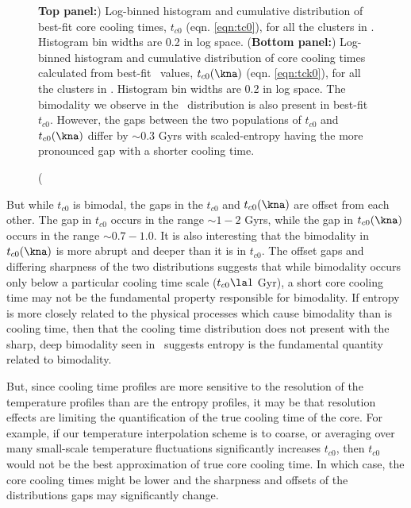 \begin{figure}[htp]
\begin{center}
\begin{minipage}[htp]{0.8\linewidth}
    \end{minipage}
    \caption[Histograms and cumulative distributions of cooling
      times.]({{\bfseries{Top panel:}}) Log-binned histogram and
      cumulative distribution of best-fit core cooling times, $t_{c0}$
      (eqn. \ref{eqn:tc0}), for all the clusters in \accept. Histogram
      bin widths are 0.2 in log space. ({\bfseries{Bottom panel:}})
      Log-binned histogram and cumulative distribution of core cooling
      times calculated from best-fit \kna\ values, $t_{c0}(\kna)$
      (eqn. \ref{eqn:tck0}), for all the clusters in
      \accept. Histogram bin widths are 0.2 in log space. The
      bimodality we observe in the \kna\ distribution is also present
      in best-fit $t_{c0}$. However, the gaps between the two
      populations of $t_{c0}$ and $t_{c0}(\kna)$ differ by $\sim 0.3$
      Gyrs with scaled-entropy having the more pronounced gap with a
      shorter cooling time.}
    \label{fig:t0}
  \end{center}
\end{figure}

But while $t_{c0}$ is bimodal, the gaps in the $t_{c0}$ and
$t_{c0}(\kna)$ are offset from each other. The gap in $t_{c0}$ occurs
in the range $\sim 1-2$ Gyrs, while the gap in $t_{c0}(\kna)$ occurs
in the range $\sim 0.7-1.0$. It is also interesting that the
bimodality in $t_{c0}(\kna)$ is more abrupt and deeper than it is in
$t_{c0}$. The offset gaps and differing sharpness of the two
distributions suggests that while bimodality occurs only below a
particular cooling time scale ($t_{c0} \la 1$ Gyr), a short core
cooling time may not be the fundamental property responsible for
bimodality. If entropy is more closely related to the physical
processes which cause bimodality than is cooling time, then that the
cooling time distribution does not present with the sharp, deep
bimodality seen in \kna\ suggests entropy is the fundamental quantity
related to bimodality.

But, since cooling time profiles are more sensitive to the resolution
of the temperature profiles than are the entropy profiles, it may be
that resolution effects are limiting the quantification of the true
cooling time of the core. For example, if our temperature
interpolation scheme is to coarse, or averaging over many small-scale
temperature fluctuations significantly increases $t_{c0}$, then
$t_{c0}$ would not be the best approximation of true core cooling
time. In which case, the core cooling times might be lower and the
sharpness and offsets of the distributions gaps may significantly
change.

